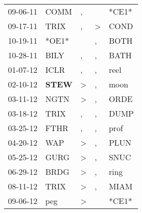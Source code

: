 \begin{supertabular}{p{0.07\textwidth}p{0.06\textwidth}p{0.02\textwidth}p{0.02\textwidth}p{0.06\textwidth}}
          09-06-11\textsuperscript{} &           COMM\textsuperscript{} &                , &                  &                            *CE1* \\
          09-17-11\textsuperscript{} &           TRIX\textsuperscript{} &                , &     \textgreater &           COND\textsuperscript{} \\
          10-19-11\textsuperscript{} &                            *OE1* &                  &                , &           BOTH\textsuperscript{} \\
          10-28-11\textsuperscript{} &           BILY\textsuperscript{} &                , &                , &           BATH\textsuperscript{} \\
          01-07-12\textsuperscript{} &           ICLR\textsuperscript{} &                , &                , &           reel\textsuperscript{} \\
          02-10-12\textsuperscript{} &  \textbf{STEW\textsuperscript{}} &     \textgreater &                , &           moon\textsuperscript{} \\
          03-11-12\textsuperscript{} &           NGTN\textsuperscript{} &     \textgreater &                , &           ORDE\textsuperscript{} \\
          03-18-12\textsuperscript{} &           TRIX\textsuperscript{} &                , &                , &           DUMP\textsuperscript{} \\
          03-25-12\textsuperscript{} &           FTHR\textsuperscript{} &                , &                , &           prof\textsuperscript{} \\
          04-20-12\textsuperscript{} &            WAP\textsuperscript{} &     \textgreater &                , &           PLUN\textsuperscript{} \\
          05-25-12\textsuperscript{} &           GURG\textsuperscript{} &     \textgreater &                , &           SNUC\textsuperscript{} \\
          06-29-12\textsuperscript{} &           BRDG\textsuperscript{} &     \textgreater &                , &           ring\textsuperscript{} \\
          08-11-12\textsuperscript{} &           TRIX\textsuperscript{} &     \textgreater &                , &           MIAM\textsuperscript{} \\
          09-06-12\textsuperscript{} &            peg\textsuperscript{} &     \textgreater &                  &                            *CE1* \\

\end{supertabular}

